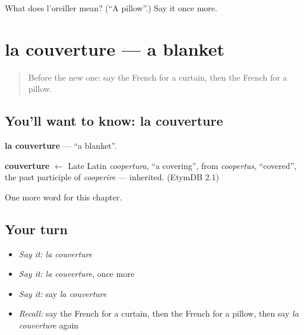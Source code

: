 \begin{tcolorbox}[breakable,colback=teal!4,colframe=teal!35!black,title={Before you move on}]
What does l'oreiller mean? (\textquotedblleft{}A pillow\textquotedblright{}.) Say it once more.
\end{tcolorbox}
\section[la couverture]{la couverture — a blanket}

\label{lesson:FR-C113-couverture}



\begin{quote}
Before the new one: say the French for a curtain, then the French for a pillow.
\end{quote}

\subsection*{You'll want to know: la couverture}
\textbf{la couverture} — \textquotedblleft{}a blanket\textquotedblright{}.

\begin{cousinweb}
\textbf{couverture} $\leftarrow$ Late Latin \emph{coopertura}, \textquotedblleft{}a covering\textquotedblright{}, from \emph{coopertus}, \textquotedblleft{}covered\textquotedblright{}, the past participle of \emph{cooperire} — inherited. (EtymDB 2.1)
\end{cousinweb}

\begin{grammarlens}[title={What you've built}]
One more word for this chapter.
\end{grammarlens}

\subsection*{Your turn}
\begin{itemize}
\raggedright
  \item \emph{Say it:} \emph{la couverture}
  \item \emph{Say it:} \emph{la couverture}, once more
  \item \emph{Say it:} say \emph{la couverture}
  \item \emph{Recall:} say the French for a curtain, then the French for a pillow, then say \emph{la couverture} again
\end{itemize}

